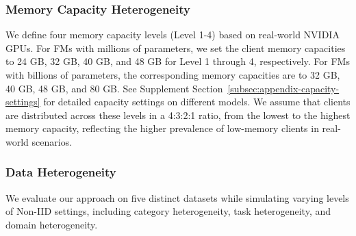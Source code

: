 \documentclass[sigconf]{acmart}
\begin{document}
\subsubsection{Memory Capacity Heterogeneity}
%
%
We define four memory capacity levels (Level 1-4) based on real-world NVIDIA GPUs. For FMs with millions of parameters, we set the client memory capacities to 24 GB, 32 GB, 40 GB, and 48 GB for Level 1 through 4, respectively. For FMs with billions of parameters, the corresponding memory capacities are to 32 GB, 40 GB, 48 GB, and 80 GB. See {{Supplement Section~\ref{subsec:appendix-capacity-settings}}} for detailed capacity settings on different models. We assume that clients are distributed across these levels in a 4:3:2:1 ratio, from the lowest to the highest memory capacity, reflecting the higher prevalence of low-memory clients in real-world scenarios.


\subsubsection{Data Heterogeneity}

We evaluate our approach on five distinct datasets while simulating varying levels of Non-IID settings, including category heterogeneity, task heterogeneity, and domain heterogeneity.
\end{document}
